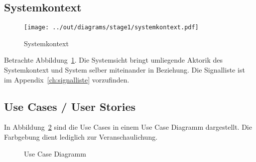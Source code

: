 
\FloatBarrier


\subsection{Systemkontext}\label{subsec:systemkontext}



\begin{figure}
    \centering
    \texttt{[image: ../out/diagrams/stage1/systemkontext.pdf]}
    \caption{Systemkontext}
    \label{fig:systemkontext}
\end{figure}


Betrachte Abbildung~\ref{fig:systemkontext}.
Die Systemsicht bringt umliegende Aktorik des Systemkontext und System selber miteinander in Beziehung.
Die Signalliste ist im Appendix~\ref{ch:signalliste} vorzufinden.


\subsection{Use Cases / User Stories}\label{subsec:use-cases-user-stories}

In Abbildung~\ref{fig:ucd} sind die Use Cases in einem Use Case Diagramm dargestellt.
Die Farbgebung dient lediglich zur Veranschaulichung.

\begin{figure}[h]
    \centering
    \caption{Use Case Diagramm}
    \label{fig:ucd}
\end{figure}


